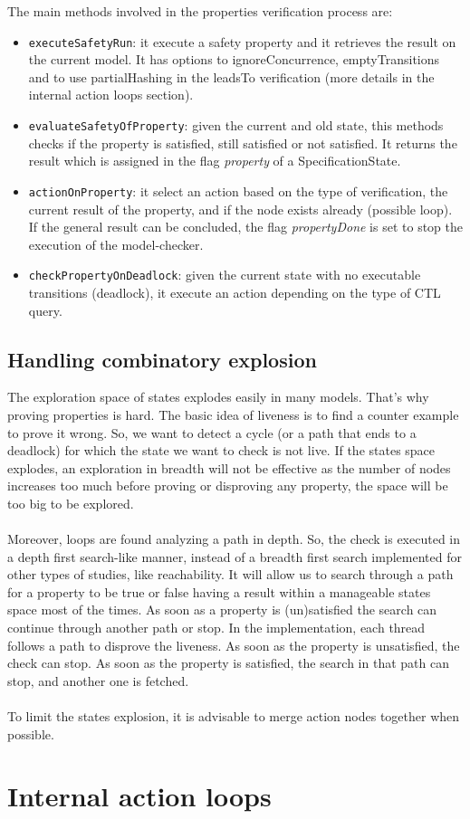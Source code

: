 \documentclass[12pt]{article}
\begin{document}
The main methods involved in the properties verification process are:
\begin{itemize}
	\item \texttt{executeSafetyRun}: it execute a safety property and it retrieves the result on the current model. It has options to ignoreConcurrence, emptyTransitions and to use partialHashing in the leadsTo verification (more details in the internal action loops section).
	\item \texttt{evaluateSafetyOfProperty}: given the current and old state, this methods checks if the property is satisfied, still satisfied or not satisfied. It returns the result which is assigned in the flag \textit{property} of a SpecificationState.
	\item \texttt{actionOnProperty}: it select an action based on the type of verification, the current result of the property, and if the node exists already (possible loop). If the general result can be concluded, the flag \textit{propertyDone} is set to stop the execution of the model-checker.
	\item \texttt{checkPropertyOnDeadlock}: given the current state with no executable transitions (deadlock), it execute an action depending on the type of CTL query.
\end{itemize}

\subsection{Handling combinatory explosion}
The exploration space of states explodes easily in many models. That's why proving properties is hard. The basic idea of liveness is to find a counter example to prove it wrong. So, we want to detect a cycle (or a path that ends to a deadlock) for which the state we want to check is not live. If the states space explodes, an exploration in breadth will not be effective as the number of nodes increases too much before proving or disproving any property, the space will be too big to be explored.
\\\\
Moreover, loops are found analyzing a path in depth. So, the check is executed in a depth first search-like manner, instead of a breadth first search implemented for other types of studies, like reachability. It will allow us to search through a path for a property to be true or false having a result within a manageable states  space most of the times. As soon as a property is (un)satisfied the search can continue through another path or stop. In the implementation, each thread follows a path to disprove the liveness. As soon as the property is unsatisfied, the check can stop. As soon as the property is satisfied, the search in that path can stop, and another one is fetched.
\\\\
To limit the states explosion, it is advisable to merge action nodes together when possible.

\section{Internal action loops}
\end{document}
